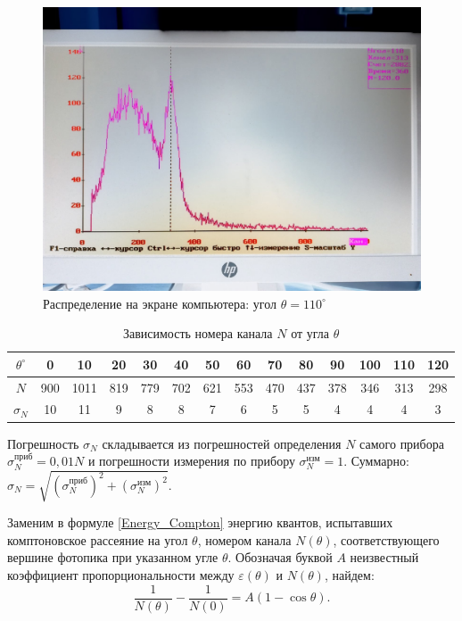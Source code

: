 	\begin{figure}[h!]
		\centering
		\includegraphics[width=\linewidth]{Pictures/110Neg}
		\caption{Распределение на экране компьютера: угол $\theta = 110^\circ$}
	\end{figure}

	
	\newpage
	\begin{table}[h!]
		\centering
		\begin{tabular}{|c|c|c|c|c|c|c|c|c|c|c|c|c|c|}
			\hline
			$\theta^\circ$ & 0   & 10   & 20  & 30  & 40  & 50  & 60  & 70  & 80  & 90  & 100 & 110 & 120 \\ \hline
			$N$            & 900 & 1011 & 819 & 779 & 702 & 621 & 553 & 470 & 437 & 378 & 346 & 313 & 298 \\ \hline
			$\sigma_N$     & 10  & 11   & 9   & 8   & 8   & 7   & 6   & 5   & 5   & 4   & 4   & 4   & 3   \\ \hline
		\end{tabular}
		\caption{Зависимость номера канала $N$ от угла $\theta$}
		\label{Compton_Table}
	\end{table}

	Погрешность $\sigma_N$ складывается из погрешностей определения $N$ самого прибора $\sigma_N^\text{приб} = 0,01N$ и погрешности измерения по прибору $\sigma_N^\text{изм} = 1$. Суммарно: $\sigma_N = \sqrt{(\sigma_N^\text{приб})^2 + (\sigma_N^\text{изм})^2}$.
	
	
	Заменим в формуле \eqref{Energy_Compton} энергию квантов, испытавших комптоновское рассеяние на угол $\theta$, номером канала $N(\theta)$, соответствующего вершине фотопика при указанном угле $\theta$. Обозначая буквой $A$ неизвестный коэффициент пропорциональности между $\varepsilon(\theta)$ и $N(\theta)$, найдем:
	\begin{equation}
		\frac{1}{N(\theta)} - \frac{1}{N(0)} = A(1 - \cos\theta).
	\end{equation}
	
